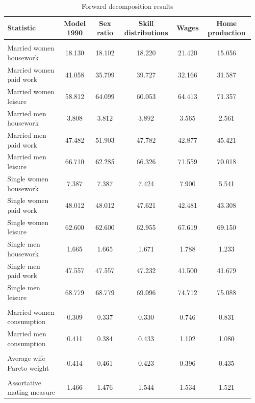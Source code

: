 \documentclass[12pt]{article}
\begin{document}
\begin{table}
	\centering
	\caption{Forward decomposition results}
	\begin{tabular}{lccccc}
		\toprule
		Statistic & Model 1990 & Sex ratio & Skill distributions & Wages & Home production \\
		\midrule
		&       &       &       &       &  \\
		Married women housework & 18.130 & 18.102 & 18.220 & 21.420 & 15.056 \\
		Married women paid work & 41.058 & 35.799 & 39.727 & 32.166 & 31.587 \\
		Married women leisure & 58.812 & 64.099 & 60.053 & 64.413 & 71.357 \\
		Married men housework & 3.808 & 3.812 & 3.892 & 3.565 & 2.561 \\
		Married men paid work & 47.482 & 51.903 & 47.782 & 42.877 & 45.421 \\
		Married men leisure & 66.710 & 62.285 & 66.326 & 71.559 & 70.018 \\
		Single women housework & 7.387 & 7.387 & 7.424 & 7.900 & 5.541 \\
		Single women paid work & 48.012 & 48.012 & 47.621 & 42.481 & 43.308 \\
		Single women leisure & 62.600 & 62.600 & 62.955 & 67.619 & 69.150 \\
		Single men housework & 1.665 & 1.665 & 1.671 & 1.788 & 1.233 \\
		Single men paid work & 47.557 & 47.557 & 47.232 & 41.500 & 41.679 \\
		Single men leisure & 68.779 & 68.779 & 69.096 & 74.712 & 75.088 \\
		&       &       &       &       &  \\
		Married women consumption & 0.309 & 0.337 & 0.330 & 0.746 & 0.831 \\
		Married men consumption & 0.411 & 0.384 & 0.433 & 1.102 & 1.080 \\
		&       &       &       &       &  \\
		Average wife Pareto weight & 0.414 & 0.461 & 0.423 & 0.396 & 0.435 \\
		&       &       &       &       &  \\
		Assortative mating measure & 1.466 & 1.476 & 1.544 & 1.534 & 1.521 \\
		\bottomrule
		\bottomrule
	\end{tabular}
	\label{tab:for_decomp}
\end{table}
\end{document}
